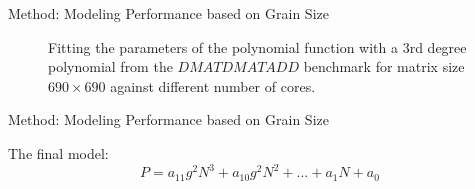 \documentclass[10pt]{beamer}
\begin{document}
\begin{frame}{Method: Modeling Performance based on Grain Size}
\begin{outline}
\begin{figure}[H]
			\caption{Fitting the parameters of the polynomial function with a $3$rd degree polynomial from the $DMATDMATADD$ benchmark for matrix size $690\times690$ against different number of cores.}	
			\label{fig15}
		\end{figure}
	\end{outline}
\end{frame}


\begin{frame}{Method: Modeling Performance based on Grain Size}
	\begin{outline}
		The final model: $$P=a_{11}g^2N^3+a_{10}g^2N^2+...+a_1N+a_0$$
	\begin{figure}[H]
		\centering
		\hfill

\end{figure}
\end{outline}
\end{frame}
\end{document}
